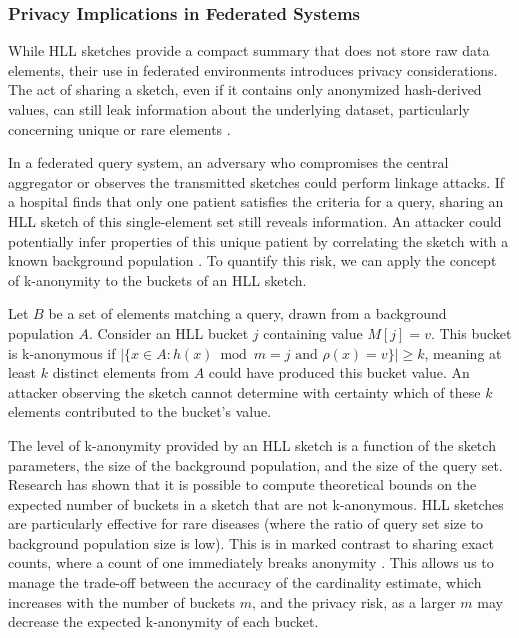 \subsubsection{Privacy Implications in Federated Systems} \label{subsubsec:hll-privacy}

While HLL sketches provide a compact summary that does not store raw data elements, their use in federated environments introduces privacy considerations. The act of sharing a sketch, even if it contains only anonymized hash-derived values, can still leak information about the underlying dataset, particularly concerning unique or rare elements \cite{Le2025ByzantineRF}.

In a federated query system, an adversary who compromises the central aggregator or observes the transmitted sketches could perform linkage attacks. If a hospital finds that only one patient satisfies the criteria for a query, sharing an HLL sketch of this single-element set still reveals information. An attacker could potentially infer properties of this unique patient by correlating the sketch with a known background population \cite{Le2025ByzantineRF}. To quantify this risk, we can apply the concept of k-anonymity to the buckets of an HLL sketch.

\begin{definition}
    Let $B$ be a set of elements matching a query, drawn from a background population $A$. Consider an HLL bucket $j$ containing value $M[j] = v$. This bucket is k-anonymous if $|\{x \in A : h(x) \bmod m = j \text{ and } \rho(x) = v\}| \geq k$, meaning at least $k$ distinct elements from $A$ could have produced this bucket value. An attacker observing the sketch cannot determine with certainty which of these $k$ elements contributed to the bucket's value.
\end{definition}

The level of k-anonymity provided by an HLL sketch is a function of the sketch parameters, the size of the background population, and the size of the query set. Research has shown that it is possible to compute theoretical bounds on the expected number of buckets in a sketch that are not k-anonymous. HLL sketches are particularly effective for rare diseases (where the ratio of query set size to background population size is low). This is in marked contrast to sharing exact counts, where a count of one immediately breaks anonymity \cite{Le2025ByzantineRF}. This allows us to manage the trade-off between the accuracy of the cardinality estimate, which increases with the number of buckets $m$, and the privacy risk, as a larger $m$ may decrease the expected k-anonymity of each bucket.

